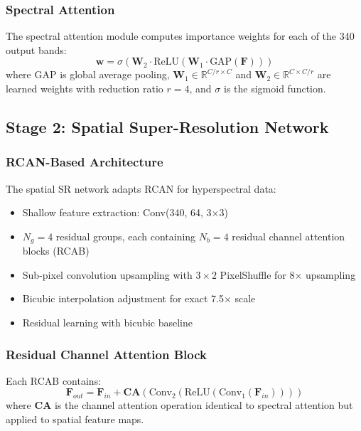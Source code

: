 \documentclass[]{spieman}
\begin{document}
\subsubsection{Spectral Attention}

The spectral attention module computes importance weights for each of the 340 output bands:
\begin{equation}
\mathbf{w} = \sigma(\mathbf{W}_2 \cdot \text{ReLU}(\mathbf{W}_1 \cdot \text{GAP}(\mathbf{F})))
\end{equation}
where GAP is global average pooling, $\mathbf{W}_1 \in \mathbb{R}^{C/r \times C}$ and $\mathbf{W}_2 \in \mathbb{R}^{C \times C/r}$ are learned weights with reduction ratio $r=4$, and $\sigma$ is the sigmoid function.

\subsection{Stage 2: Spatial Super-Resolution Network}

\subsubsection{RCAN-Based Architecture}

The spatial SR network adapts RCAN \cite{zhang2018rcan} for hyperspectral data:
\begin{itemize}
\item Shallow feature extraction: Conv(340, 64, 3×3)
\item $N_g=4$ residual groups, each containing $N_b=4$ residual channel attention blocks (RCAB)
\item Sub-pixel convolution upsampling \cite{shi2016subpixel} with $3 \times 2$ PixelShuffle for 8× upsampling
\item Bicubic interpolation adjustment for exact 7.5× scale
\item Residual learning with bicubic baseline
\end{itemize}

\subsubsection{Residual Channel Attention Block}

Each RCAB contains:
\begin{equation}
\mathbf{F}_{out} = \mathbf{F}_{in} + \mathbf{CA}(\text{Conv}_2(\text{ReLU}(\text{Conv}_1(\mathbf{F}_{in}))))
\end{equation}
where $\mathbf{CA}$ is the channel attention operation identical to spectral attention but applied to spatial feature maps.
\end{document}
